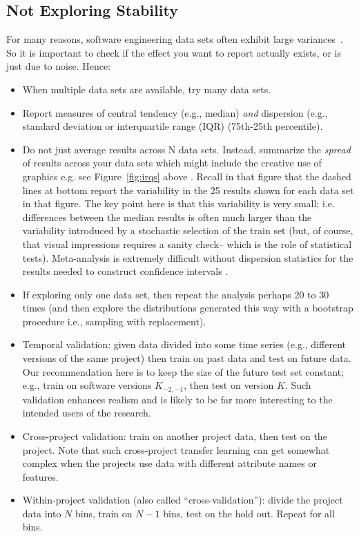 \documentclass[preprint,10pt]{elsarticle}
\newcommand{\RED}{\color{red}}
\newcommand{\BLACK}{\color{black}}
\begin{document}
\subsection{Not Exploring Stability}

For many reasons, software engineering data sets often exhibit large variances~\cite{menzies12}. So it is important to check if the effect you want to report actually exists, or is just due to noise. Hence:

\begin{itemize}
\item When multiple data sets are available, try many data sets.
\item Report measures of central tendency (e.g., median) \textit{and} dispersion (e.g., standard deviation or interquartile range (IQR) (75th-25th percentile).
\item Do not just average results across N data sets. Instead, summarize the \textit{spread} of results across your data sets which might include the creative use of graphics e.g. 
\RED see Figure~\ref{fig:irqs} above \BLACK. Recall
in that figure that the dashed lines at bottom
report the variability in the 25 results shown for each
data set in that figure. The key point here is that this
variability is very small; i.e.  differences between the median results is often much larger than the variability introduced by a stochastic selection of the train set (but, of course, that visual impressions requires a sanity check-- which is the role of statistical tests). Meta-analysis is extremely difficult without dispersion statistics for the results needed to construct confidence intervals \cite{Bore09,Schm14}.
\item If exploring only one data set, then repeat the analysis perhaps 20 to 30 times (and then explore the distributions generated this way with a bootstrap procedure i.e., sampling with replacement). %
\item Temporal validation: given data divided into some time series (e.g., different versions of the same project) then train on past data and test on future data. Our recommendation here is to keep the size of the future test set constant; e.g., train on software versions $K_{-2,-1}$, then test on version $K$.  Such validation enhances realism and is likely to be far more interesting to the intended users of the research.
\item Cross-project validation: train on another project data, then test on the project. Note that such cross-project transfer learning can get somewhat complex when the projects use data with different attribute names or features.
\item Within-project validation (also called ``cross-validation''): divide the project data into $N$ bins, train on $N-1$ bins, test on the hold out. Repeat for all bins.  
\end{itemize}
\end{document}
